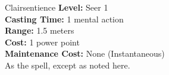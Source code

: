 {Clairsentience}
{
	\textbf{Level:}
	Seer 1\\
	\textbf{Casting Time:}
	1 mental action\\
	\textbf{Range:}
	1.5 meters\\
	\textbf{Cost:}
	1 power point\\
	\textbf{Maintenance Cost:}
	None (Instantaneous)\\
}
{
	As the  spell, except as noted here.
}
